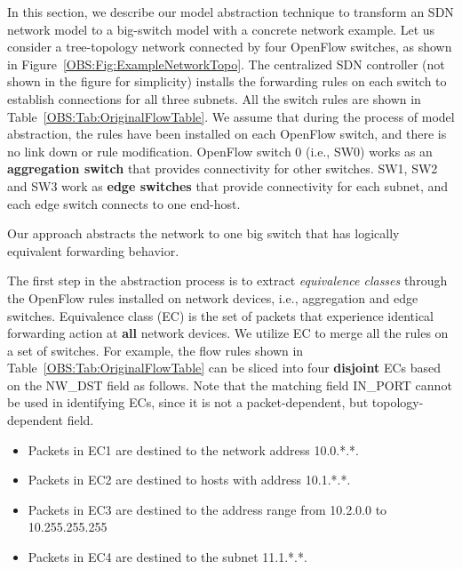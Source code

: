 In this section, we describe our model abstraction technique to transform an SDN network model to a big-switch model with a concrete network example.
Let us consider a tree-topology network connected by four OpenFlow switches, as shown in Figure~\ref{OBS:Fig:ExampleNetworkTopo}.
The centralized SDN controller (not shown in the figure for simplicity) installs the forwarding rules on each switch to establish connections for all three subnets.
All the switch rules are shown in Table~\ref{OBS:Tab:OriginalFlowTable}.
We assume that during the process of model abstraction, the rules have been installed on each OpenFlow switch,
and there is no link down or rule modification. OpenFlow switch 0 (i.e., SW0) works as an \textbf{aggregation switch}
that provides connectivity for other switches. SW1, SW2 and SW3 work as \textbf{edge switches} that provide connectivity for each subnet,
and each edge switch connects to one end-host.

Our approach abstracts the network to one big switch that has logically equivalent forwarding behavior.

The first step in the abstraction process is to extract \textit{equivalence classes} through the OpenFlow rules installed on network devices, i.e., aggregation and edge switches.
Equivalence class (EC) is the set of packets that experience identical forwarding action at \textbf{all} network devices.
We utilize EC to merge all the rules on a set of switches. For example, the flow rules shown in Table~\ref{OBS:Tab:OriginalFlowTable} can be sliced into
four \textbf{disjoint} ECs based on the NW\_DST field as follows. Note that the matching field IN\_PORT cannot be used in identifying ECs,
since it is not a packet-dependent, but topology-dependent field.

\begin{itemize}
\item Packets in EC1 are destined to the network address 10.0.*.*.
\item Packets in EC2 are destined to hosts with address 10.1.*.*.
\item Packets in EC3 are destined to the address range from 10.2.0.0 to 10.255.255.255
\item Packets in EC4 are destined to the subnet 11.1.*.*.
\end{itemize}

